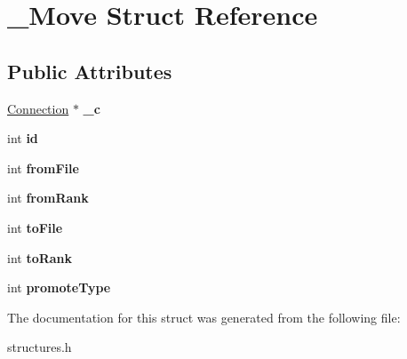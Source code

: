 \hypertarget{struct__Move}{
\section{\_\-Move Struct Reference}
\label{struct__Move}
}
\subsection*{Public Attributes}
\begin{DoxyCompactItemize}
\item 
\hypertarget{struct__Move_affb4d1e7fe2099f6a78ccb7edf8d39e3}{
\hyperlink{structConnection}{Connection} $\ast$ {\bfseries \_\-c}}
\label{struct__Move_affb4d1e7fe2099f6a78ccb7edf8d39e3}

\item 
\hypertarget{struct__Move_a1bf3cdb5beb2d1e9be8bca72984af885}{
int {\bfseries id}}
\label{struct__Move_a1bf3cdb5beb2d1e9be8bca72984af885}

\item 
\hypertarget{struct__Move_a41c2a8720cd58dfc1f5a1279b63b461e}{
int {\bfseries fromFile}}
\label{struct__Move_a41c2a8720cd58dfc1f5a1279b63b461e}

\item 
\hypertarget{struct__Move_aa143a815d80d154576ec8b48c3a0c05b}{
int {\bfseries fromRank}}
\label{struct__Move_aa143a815d80d154576ec8b48c3a0c05b}

\item 
\hypertarget{struct__Move_a60ed49bc97b38dce879128831517c58e}{
int {\bfseries toFile}}
\label{struct__Move_a60ed49bc97b38dce879128831517c58e}

\item 
\hypertarget{struct__Move_a95157f41f4f95beb7299f58cc531a5b5}{
int {\bfseries toRank}}
\label{struct__Move_a95157f41f4f95beb7299f58cc531a5b5}

\item 
\hypertarget{struct__Move_ae7270a2a5081d6a2c6bb644c1489077f}{
int {\bfseries promoteType}}
\label{struct__Move_ae7270a2a5081d6a2c6bb644c1489077f}

\end{DoxyCompactItemize}


The documentation for this struct was generated from the following file:\begin{DoxyCompactItemize}
\item 
structures.h\end{DoxyCompactItemize}
